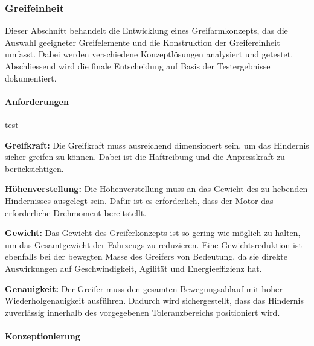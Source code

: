 \documentclass[main.tex]{subfiles} %
\begin{document}

\subsubsection{Greifeinheit}

Dieser Abschnitt behandelt die Entwicklung eines Greifarmkonzepts, das die
Auswahl geeigneter Greifelemente und die Konstruktion der Greifereinheit
umfasst. Dabei werden verschiedene Konzeptlösungen analysiert und getestet.
Abschliessend wird die finale Entscheidung auf Basis der Testergebnisse
dokumentiert.
\paragraph{Anforderungen}

\begin{description}
    \item[test]

\end{description}

\textbf{Greifkraft:} \newline
Die Greifkraft muss ausreichend dimensionert sein, um das Hindernis sicher greifen zu können.
Dabei ist die Haftreibung und die Anpresskraft zu berücksichtigen.

\textbf{Höhenverstellung:} \newline
Die Höhenverstellung muss an das Gewicht des zu hebenden Hindernisses ausgelegt sein.
Dafür ist es erforderlich, dass der Motor das erforderliche Drehmoment bereitstellt.

\textbf{Gewicht:} \newline
Das Gewicht des Greiferkonzepts ist so gering wie möglich zu halten,
um das Gesamtgewicht der Fahrzeugs zu reduzieren.
Eine Gewichtsreduktion ist ebenfalls bei der bewegten Masse des Greifers von Bedeutung,
da sie direkte Auswirkungen auf Geschwindigkeit, Agilität und Energieeffizienz hat.

\textbf{Genauigkeit:} \newline
Der Greifer muss den gesamten Bewegungsablauf mit hoher Wiederholgenauigkeit ausführen.
Dadurch wird sichergestellt, dass das Hindernis zuverlässig innerhalb des vorgegebenen
Toleranzbereichs positioniert wird.

\paragraph{Konzeptionierung}
\end{document}
